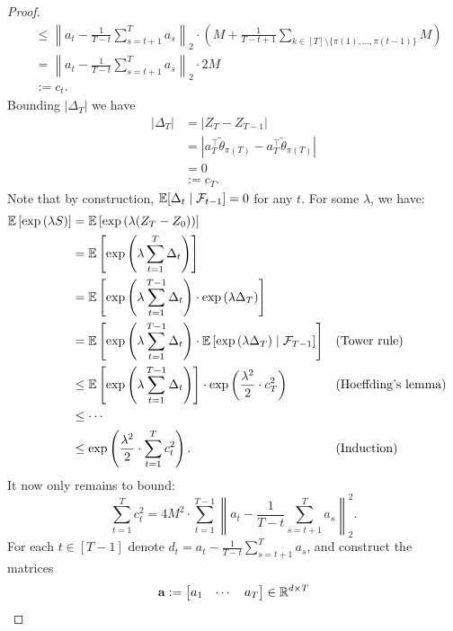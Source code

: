 \begin{proof}
\begin{align*}
    &\leq \left\|a_t - \frac{1}{T-t}\sum_{s = t +1}^T a_s\right\|_2 \cdot \left(M  + \frac{1}{T-t+1}\sum_{k \in [T] \setminus \{\pi(1),\dots,\pi(t-1)\}} M\right) \\
    &= \left\|a_t - \frac{1}{T-t}\sum_{s = t +1}^T a_s\right\|_2 \cdot 2M \\
    &:= c_t.
\end{align*}
Bounding $|\Delta_T|$ we have \begin{align*}
    |\Delta_T| &= |Z_T - Z_{T-1}| \\
    &= \left|a_{T}^{\top}\tilde{\theta}_{\pi(T)} - a_{T}^{\top}\tilde{\theta}_{\pi(T)}\right| \\
    &= 0 \\
    &:= c_T.
\end{align*}
Note that by construction, $\mathbb{E}[\Delta_t \mid \mathcal{F}_{t-1}] = 0$ for any $t$. For some $\lambda$, we have:
    \begin{align*}
        \mathbb{E}\left[\exp\left(\lambda S\right)\right] &= \mathbb{E}\left[\exp\left(\lambda (Z_T - Z_0)\right)\right] \\
        &= \mathbb{E}\left[\exp\left(\lambda \sum_{t=1}^T\Delta_t\right)\right] \\
        &= \mathbb{E}\left[\exp\left(\lambda \sum_{t=1}^{T-1}\Delta_t\right)\cdot\exp\left(\lambda \Delta_T\right)\right] \\
        &= \mathbb{E}\left[\exp\left(\lambda \sum_{t=1}^{T-1}\Delta_t\right)\cdot\mathbb{E}\left[\exp\left(\lambda \Delta_T\right) \mid \mathcal{F}_{T-1}\right]\right] && (\text{Tower rule}) \\
        &\leq \mathbb{E}\left[\exp\left(\lambda \sum_{t=1}^{T-1}\Delta_t\right)\right] \cdot\exp\left(\frac{\lambda^2}{2} \cdot  c_T^2\right) && (\text{Hoeffding's lemma}) \\
        &\leq \cdots \\
        &\leq \exp\left(\frac{\lambda^2}{2} \cdot  \sum_{t=1}^T c_{t}^2\right). && 
        (\text{Induction})
    \end{align*}
It now only remains to bound: \begin{equation}\sum_{t=1}^{T} c_t^2 = 4M^2 \cdot \sum_{t=1}^{T-1}\left\|a_t - \frac{1}{T-t}\sum_{s = t +1}^T a_s\right\|_2^2.\end{equation}For each $t \in [T-1]$ denote $d_t = a_t - \frac{1}{T-t}\sum_{s = t +1}^T a_s$, and construct the matrices
\begin{equation}\mathbf{a} : = \begin{bmatrix}
    a_1 & \cdots &a_{T}
\end{bmatrix} \in \mathbb{R}^{d \times T}\end{equation}

\end{proof}
